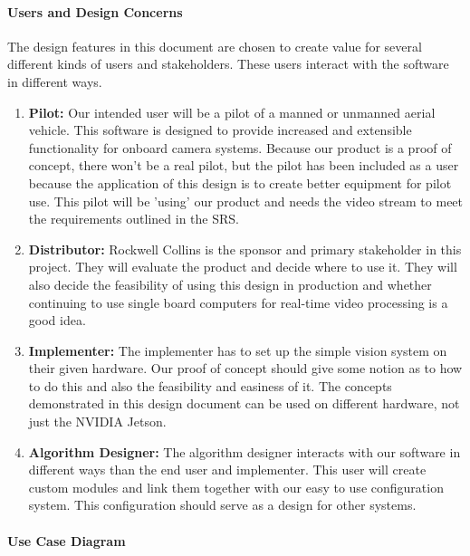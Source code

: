 	\paragraph{Users and Design Concerns}
	The design features in this document are chosen to create value for several different
kinds of users and stakeholders. These users interact with the software in different ways.\\
	\begin{enumerate}[leftmargin=2cm,labelindent=2cm]
    	\item \textbf{Pilot:}
	Our intended user will be a pilot of a manned or unmanned aerial vehicle. This software
	is designed to provide increased and extensible functionality for onboard camera
	systems. Because our product is a proof of concept, there won't be a real pilot, but the
	pilot has been included as a user because the application of this design is to create
	better equipment for pilot use. This pilot will be 'using' our product and needs the
	video stream to meet the requirements outlined in the SRS.
	\item \textbf{Distributor:}
	Rockwell Collins is the sponsor and primary stakeholder in this project. They will
	evaluate the product and decide where to use it. They will also decide the feasibility of
	using this design in production and whether continuing to use single board computers
	for real-time video processing is a good idea.
	\item \textbf{Implementer:}
	The implementer has to set up the simple vision system on their given hardware. Our
	proof of concept should give some notion as to how to do this and also the feasibility
	and easiness of it. The concepts demonstrated in this design document can be used on
	different hardware, not just the NVIDIA Jetson.
	\item \textbf{Algorithm Designer:}
	The algorithm designer interacts with our software in different ways than the end user
	and implementer. This user will create custom modules and link them together with our
	easy to use configuration system. This configuration should serve as a design for other
	systems.\\
	\end{enumerate}
	
	\paragraph{Use Case Diagram}
	
